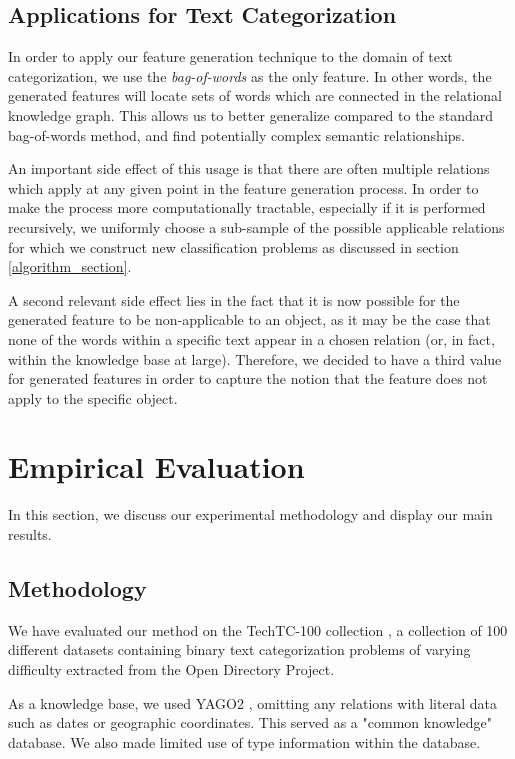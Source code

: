 \documentclass{article}
\theoremstyle{definition}
\begin{document}
\subsection{Applications for Text Categorization}
In order to apply our feature generation technique to the domain of text categorization, we use the \emph{bag-of-words} as the only feature. In other words, the generated features will locate sets of words which are connected in the relational knowledge graph. This allows us to better generalize compared to the standard bag-of-words method, and find potentially complex semantic relationships.

An important side effect of this usage is that there are often multiple relations which apply at any given point in the feature generation process. In order to make the process more computationally tractable, especially if it is performed recursively, we uniformly choose a sub-sample of the possible applicable relations for which we construct new classification problems as discussed in section \ref{algorithm_section}.

A second relevant side effect lies in the fact that it is now possible for the generated feature to be non-applicable to an object, as it may be the case that none of the words within a specific text appear in a chosen relation (or, in fact, within the knowledge base at large). Therefore, we decided to have a third value for generated features in order to capture the notion that the feature does not apply to the specific object.

\section{Empirical Evaluation}
In this section, we discuss our experimental methodology and display our main results.
\subsection{Methodology}
We have evaluated our method on the TechTC-100 collection \citep{gabrilovich2004text}, a collection of 100 different datasets containing binary text categorization problems of varying difficulty extracted from the Open Directory Project.

As a knowledge base, we used YAGO2 \citep{hoffart2013yago2}, omitting any relations with literal data such as dates or geographic coordinates. This served as a "common knowledge" database. We also made limited use of type information within the database.
\end{document}
